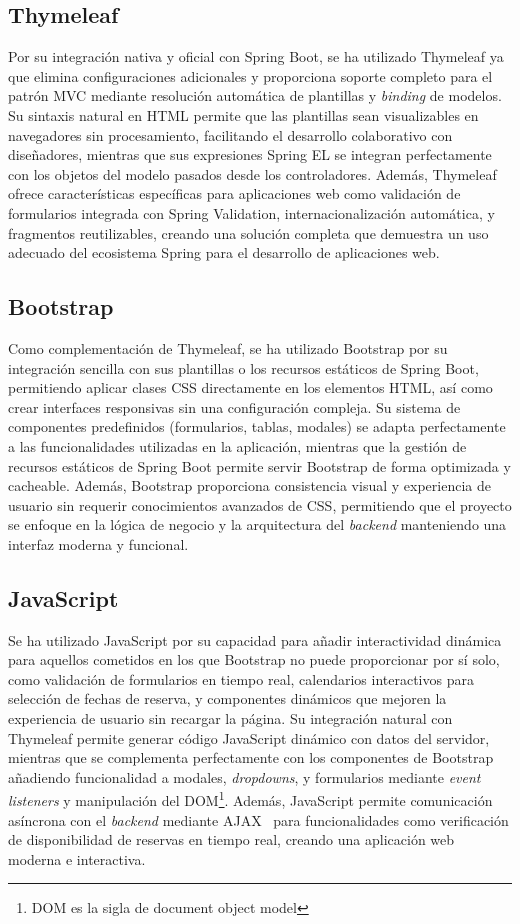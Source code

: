 \subsection{Thymeleaf}\label{thymeleaf}
Por su integración nativa y oficial con Spring Boot, se ha utilizado Thymeleaf ya que elimina configuraciones adicionales y proporciona soporte completo para el patrón MVC mediante resolución automática de plantillas y \emph{binding} de modelos. Su sintaxis natural en HTML permite que las plantillas sean visualizables en navegadores sin procesamiento, facilitando el desarrollo colaborativo con diseñadores, mientras que sus expresiones Spring EL se integran perfectamente con los objetos del modelo pasados desde los controladores. Además, Thymeleaf ofrece características específicas para aplicaciones web como validación de formularios integrada con Spring Validation, internacionalización automática, y fragmentos reutilizables, creando una solución completa que demuestra un uso adecuado del ecosistema Spring para el desarrollo de aplicaciones web.

\subsection{Bootstrap}\label{bootstrap}
Como complementación de Thymeleaf, se ha utilizado Bootstrap por su integración sencilla con sus plantillas o los recursos estáticos de Spring Boot, permitiendo aplicar clases CSS directamente en los elementos HTML, así como crear interfaces responsivas sin una configuración compleja. Su sistema de componentes predefinidos (formularios, tablas, modales) se adapta perfectamente a las funcionalidades utilizadas en la aplicación, mientras que la gestión de recursos estáticos de Spring Boot permite servir Bootstrap de forma optimizada y cacheable. Además, Bootstrap proporciona consistencia visual y experiencia de usuario sin requerir conocimientos avanzados de CSS, permitiendo que el proyecto se enfoque en la lógica de negocio y la arquitectura del \emph{backend} manteniendo una interfaz moderna y funcional.

\subsection{JavaScript}\label{javascript}
Se ha utilizado JavaScript por su capacidad para añadir interactividad dinámica para aquellos cometidos en los que Bootstrap no puede proporcionar por sí solo, como validación de formularios en tiempo real, calendarios interactivos para selección de fechas de reserva, y componentes dinámicos que mejoren la experiencia de usuario sin recargar la página. Su integración natural con Thymeleaf permite generar código JavaScript dinámico con datos del servidor, mientras que se complementa perfectamente con los componentes de Bootstrap añadiendo funcionalidad a modales, \emph{dropdowns}, y formularios mediante \emph{event listeners} y manipulación del DOM\footnote{DOM es la sigla de document object model}. Además, JavaScript permite comunicación asíncrona con el \emph{backend} mediante AJAX~\cite{ajax} para funcionalidades como verificación de disponibilidad de reservas en tiempo real, creando una aplicación web moderna e interactiva.

